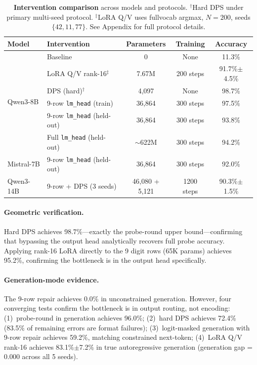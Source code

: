 \documentclass{article}
\begin{document}
\begin{table}[t]
\centering
\small
\caption{\textbf{Intervention comparison} across models and protocols.
  $^\dagger$Hard DPS under primary multi-seed protocol.
  $^\ddagger$LoRA Q/V uses fullvocab argmax, $N{=}200$, seeds $\{42, 11, 77\}$.
  See Appendix for full protocol details.}
\label{tab:intervention_comparison}
\begin{tabular}{llccc}
\toprule
Model & Intervention & Parameters & Training & Accuracy \\
\midrule
\multirow{6}{*}{Qwen3-8B} & Baseline & 0 & None & 11.3\% \\
 & LoRA Q/V rank-16$^\ddagger$ & 7.67M & 200 steps & 91.7\%$\pm$4.5\% \\
 & DPS (hard)$^\dagger$ & 4{,}097 & None & 98.7\% \\
 & 9-row \texttt{lm\_head} (train) & 36{,}864 & 300 steps & 97.5\% \\
 & 9-row \texttt{lm\_head} (held-out) & 36{,}864 & 300 steps & 93.8\% \\
 & Full \texttt{lm\_head} (held-out) & $\sim$622M & 300 steps & 94.2\% \\
\midrule
Mistral-7B & 9-row \texttt{lm\_head} (held-out) & 36{,}864 & 300 steps & 92.0\% \\
\midrule
Qwen3-14B & 9-row + DPS (3 seeds) & 46{,}080 + 5{,}121 & 1200 steps & 90.3\%$\pm$1.5\% \\
\bottomrule
\end{tabular}
\end{table}

\paragraph{Geometric verification.}
Hard DPS achieves 98.7\%---exactly the probe-round upper bound---confirming
that bypassing the output head analytically recovers full probe accuracy.
Applying rank-16 LoRA directly to the 9 digit rows (65K params) achieves 95.2\%,
confirming the bottleneck is in the output head specifically.

\paragraph{Generation-mode evidence.}
The 9-row repair achieves 0.0\% in unconstrained generation. However, four
converging tests confirm the bottleneck is in output routing, not encoding:
(1)~probe-round in generation achieves 96.0\%; (2)~hard DPS achieves 72.4\%
(83.5\% of remaining errors are format failures); (3)~logit-masked generation
with 9-row repair achieves 59.2\%, matching constrained next-token;
(4)~LoRA Q/V rank-16 achieves 83.1\%$\pm$7.2\% in true autoregressive
generation (generation gap = 0.000 across all 5 seeds).
\end{document}
